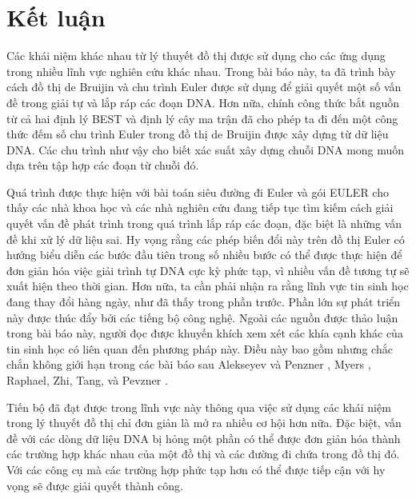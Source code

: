\documentclass[14pt, a4paper]{article}
\numberwithin{equation}{section}
\numberwithin{figure}{section}
\numberwithin{dl}{section}
\numberwithin{md}{section}
\numberwithin{bd}{section}
\numberwithin{dn}{section}
\numberwithin{hq}{section}
\begin{document}
    \section{Kết luận}

    Các khái niệm khác nhau từ lý thuyết đồ thị được sử dụng cho các ứng dụng trong nhiều lĩnh vực nghiên cứu khác nhau.
    Trong bài báo này, ta đã trình bày cách đồ thị de Bruijin và chu trình Euler được sử dụng để giải quyết một số vấn đề trong giải tự và lắp ráp các đoạn DNA.
    Hơn nữa, chính công thức bắt nguồn từ cả hai định lý BEST và định lý cây ma trận đã cho phép ta đi đến một công thức đếm số chu trình Euler trong đồ thị de Bruijin được xây dựng từ dữ liệu DNA.
    Các chu trình như vậy cho biết xác suất xây dựng chuỗi DNA mong muốn dựa trên tập hợp các đoạn từ chuỗi đó.

    Quá trình được thực hiện với bài toán siêu đường đi Euler và gói EULER cho thấy các nhà khoa học và các nhà nghiên cứu đang tiếp tục tìm kiếm cách giải quyết vấn đề phát trình trong quá trình lắp ráp các đoạn, đặc biệt là những vấn đề khi xử lý dữ liệu sai.
    Hy vọng rằng các phép biến đổi này trên đồ thị Euler có hướng biểu diễn các bước đầu tiên trong số nhiều bước có thể được thực hiện để đơn giản hóa việc giải trình tự DNA cực kỳ phức tạp, vì nhiều vấn đề tương tự sẽ xuất hiện theo thời gian.
    Hơn nữa, ta cần phải nhận ra rằng lĩnh vực tin sinh học đang thay đổi hàng ngày, như đã thấy trong phần trước.
    Phần lớn sự phát triển này được thúc đẩy bởi các tiếng bộ công nghệ.
    Ngoài các nguồn được thảo luận trong bài báo này, người đọc được khuyến khích xem xét các khía cạnh khác của tin sinh học có liên quan đến phương pháp này.
    Điều này bao gồm nhưng chắc chắn không giới hạn trong các bài báo sau Alekseyev và Penzner \cite{alekseyev2007colored}, Myers \cite{myers2005fragment}, Raphael, Zhi, Tang, và Pevzner \cite{raphael2004novel}. 

    Tiến bộ đã đạt được trong lĩnh vực này thông qua việc sử dụng các khái niệm trong lý thuyết đồ thị chỉ đơn giản là mở ra nhiều cơ hội hơn nữa.
    Đặc biệt, vấn đề với các dòng dữ liệu DNA bị hỏng một phần có thể được đơn giản hóa thành các trường hợp khác nhau của một đồ thị và các đường đi chứa trong đồ thị đó.
    Với các công cụ mà các trường hợp phức tạp hơn có thể được tiếp cận với hy vọng sẽ được giải quyết thành công.

    \newpage
    \printbibliography[title={TÀI LIỆU THAM KHẢO}]
\end{document}
